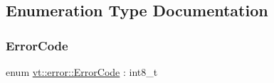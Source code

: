 \subsection{Enumeration Type Documentation}
\mbox{\label{namespacevt_1_1error_a2d36cef4c5ee65ddf503f7f4127e1829}} 
\subsubsection{\texorpdfstring{Error\+Code}{ErrorCode}}
{\footnotesize\ttfamily enum \hyperlink{namespacevt_1_1error_a2d36cef4c5ee65ddf503f7f4127e1829}{vt\+::error\+::\+Error\+Code} \+: int8\+\_\+t\hspace{0.3cm}{\ttfamily [strong]}}


